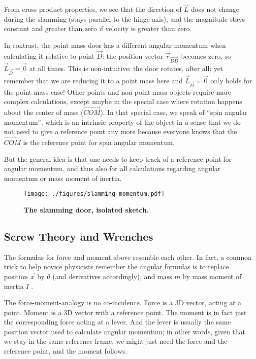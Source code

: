 From cross product properties, we see that the direction of \(\vec{L}\) does not change during the slamming (stays parallel to the hinge axis), and the magnitude stays constant and greater than zero if velocity is greater than zero.

In contrast, the point mass door has a different angular momentum when calculating it relative to point \(\vec{D}\): the position vector \(\vec{r}_{\vec{DD}}\) becomes zero, so \(\vec{L}_{\vec{D}} = \vec{0}\) at all times.
This is non-intuitive: the door rotates, after all; yet remember that we are reducing it to a point mass here and \(\vec{L}_{\vec{D}} = \vec{0}\) only holds for the point mass case!
Other points and non-point-mass-objects require more complex calculations, except maybe in the special case where rotation happens about the center of mass (\(\vec{COM}\)).
In that special case, we speak of ``spin angular momentum'', which is an intrinsic property of the object in a sense that we do not need to give a reference point any more because everyone knows that the \(\vec{COM}\) is the reference point for spin angular momentum.


But the general idea is that one needs to keep track of a reference point for angular momentum, and thus also for all calculations regarding angular momentum or mass moment of inertia.


\begin{figure}[b!]
\centering
\texttt{[image: ./figures/slamming\_momentum.pdf]}
\caption{\label{fig:slamming_momentum}\textbf{The slamming door, isolated sketch.}}
\end{figure}



\FloatBarrier
\subsection{Screw Theory and Wrenches}
\label{sec:orge01c4ba}

The formulas for force and moment above resemble each other.
In fact, a common trick to help novice physicists remember the angular formulas is to replace position \(\vec{x}\) by \(\theta\) (and derivatives accordingly), and mass \(m\) by mass moment of inertia \(I\) \citep{Tipler2007}.

The force-moment-analogy is no co-incidence.
Force is a 3D vector, acting at a point.
Moment is a 3D vector with a reference point.
The moment is in fact just the corresponding force acting at a lever.
And the lever is usually the same position vector used to calculate angular momentum; in other words, given that we stay in the same reference frame, we might just need the force and the reference point, and the moment follows.

